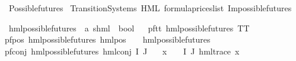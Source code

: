 %
\begin{isabellebody}%
%
%
\isadelimtheory
%
\endisadelimtheory
%
\isatagtheory
{}\isamarkupfalse%
\ Possible{\isacharunderscore}{\kern0pt}futures\isanewline
{}\ Transition{\isacharunderscore}{\kern0pt}Systems\ HML\ formula{\isacharunderscore}{\kern0pt}prices{\isacharunderscore}{\kern0pt}list\ Impossible{\isacharunderscore}{\kern0pt}futures\isanewline
{}%
\endisatagtheory
{\isafoldtheory}%
%
\isadelimtheory
%
\endisadelimtheory
%
\isadelimdocument
%
\endisadelimdocument
%
\isatagdocument
%
\isamarkuptrue%
%
\endisatagdocument
{\isafolddocument}%
%
\isadelimdocument
%
\endisadelimdocument
%
\begin{isamarkuptext}%
%
\end{isamarkuptext}\isamarkuptrue%
\isamarkupfalse%
\ hml{\isacharunderscore}{\kern0pt}possible{\isacharunderscore}{\kern0pt}futures\ {\isacharcolon}{\kern0pt}{\isacharcolon}{\kern0pt}\ {\isachardoublequoteopen}{\isacharparenleft}{\kern0pt}{\isacharprime}{\kern0pt}a{\isacharcomma}{\kern0pt}\ {\isacharprime}{\kern0pt}s{\isacharparenright}{\kern0pt}hml\ {\isasymRightarrow}\ bool{\isachardoublequoteclose}\isanewline
\ \ \isanewline
pf{\isacharunderscore}{\kern0pt}tt{\isacharcolon}{\kern0pt}\ {\isachardoublequoteopen}hml{\isacharunderscore}{\kern0pt}possible{\isacharunderscore}{\kern0pt}futures\ TT{\isachardoublequoteclose}\ {\isacharbar}{\kern0pt}\isanewline
pf{\isacharunderscore}{\kern0pt}pos{\isacharcolon}{\kern0pt}\ {\isachardoublequoteopen}hml{\isacharunderscore}{\kern0pt}possible{\isacharunderscore}{\kern0pt}futures\ {\isacharparenleft}{\kern0pt}hml{\isacharunderscore}{\kern0pt}pos\ {\isasymalpha}\ {\isasymphi}{\isacharparenright}{\kern0pt}{\isachardoublequoteclose}\ \ {\isachardoublequoteopen}hml{\isacharunderscore}{\kern0pt}possible{\isacharunderscore}{\kern0pt}futures\ {\isasymphi}{\isachardoublequoteclose}\ {\isacharbar}{\kern0pt}\isanewline
pf{\isacharunderscore}{\kern0pt}conj{\isacharcolon}{\kern0pt}\ {\isachardoublequoteopen}hml{\isacharunderscore}{\kern0pt}possible{\isacharunderscore}{\kern0pt}futures\ {\isacharparenleft}{\kern0pt}hml{\isacharunderscore}{\kern0pt}conj\ I\ J\ {\isasymPhi}{\isacharparenright}{\kern0pt}{\isachardoublequoteclose}\ \isanewline
{}\ {\isachardoublequoteopen}{\isasymforall}x\ {\isasymin}\ {\isacharparenleft}{\kern0pt}{\isasymPhi}\ {\isacharbackquote}{\kern0pt}\ {\isacharparenleft}{\kern0pt}I{\isasymunion}\ J{\isacharparenright}{\kern0pt}{\isacharparenright}{\kern0pt}{\isachardot}{\kern0pt}\ {\isacharparenleft}{\kern0pt}hml{\isacharunderscore}{\kern0pt}trace\ x{\isacharparenright}{\kern0pt}{\isachardoublequoteclose}\isanewline

\end{isabellebody}
